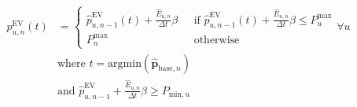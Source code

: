 \begin{equation}
\begin{split}
	p^\text{EV}_{u,n}(t) &=
	\begin{cases}
		\hat{p}^\text{EV}_{u,n-1}(t) + \frac{\hat{E}_{u,n}}{\Delta t}\beta \text{   }&\text{if } \hat{p}^\text{EV}_{u,n-1}(t) + \frac{\hat{E}_{u,n}}{\Delta t}\beta \leq P^\text{max}_{u}\\
		P^\text{max}_{n} &\text{otherwise}
 	\end{cases}
 	\forall u  \\
 	&\text{where } t = \text{argmin}(\hat{\textbf{p}}_{\text{base},n})\\
 	&\text{and } \hat{p}^\text{EV}_{u,n-1} + \frac{\hat{E}_{u,n}}{\Delta t}\beta \geq P_{\text{min},u}
\end{split}
\label{ch3:equ:valley-filling-equation}
\end{equation}